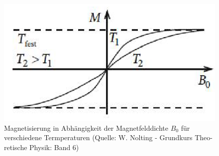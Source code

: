 \begin{figure}
  \centering
  \includegraphics[scale=0.5]{./ising-pics/ising02.png}
  \caption{Magnetisierung in Abhängigkeit der Magnetfelddichte $B_0$ für verschiedene Termperaturen (Quelle: W. Nolting - Grundkurs Theo-
retische Physik: Band 6)
}
  \label{fig:2}
\end{figure}



